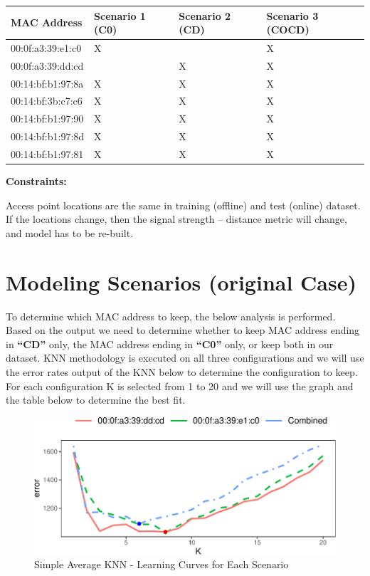 \documentclass[
]{article}
\begin{document}
\begin{longtable}[]{@{}llll@{}}
\toprule
MAC Address & Scenario 1 (C0) & Scenario 2 (CD) & Scenario 3
(COCD)\tabularnewline
\midrule
\endhead
00:0f:a3:39:e1:c0 & X & & X\tabularnewline
00:0f:a3:39:dd:cd & & X & X\tabularnewline
00:14:bf:b1:97:8a & X & X & X\tabularnewline
00:14:bf:3b:c7:c6 & X & X & X\tabularnewline
00:14:bf:b1:97:90 & X & X & X\tabularnewline
00:14:bf:b1:97:8d & X & X & X\tabularnewline
00:14:bf:b1:97:81 & X & X & X\tabularnewline
\bottomrule
\end{longtable}

\newpage

\textbf{Constraints:}

Access point locations are the same in training (offline) and test
(online) dataset. If the locations change, then the signal strength --
distance metric will change, and model has to be re-built.

\newpage

\hypertarget{modeling-scenarios-original-case}{%
\section{Modeling Scenarios (original
Case)}\label{modeling-scenarios-original-case}}

To determine which MAC address to keep, the below analysis is performed.
Based on the output we need to determine whether to keep MAC address
ending in \textbf{``CD''} only, the MAC address ending in
\textbf{``C0''} only, or keep both in our dataset. KNN methodology is
executed on all three configurations and we will use the error rates
output of the KNN below to determine the configuration to keep. For each
configuration K is selected from 1 to 20 and we will use the graph and
the table below to determine the best fit.

\begin{figure}[H]

{\centering \includegraphics{msds7333_case_study01_files/figure-latex/unnamed-chunk-9-1} 

}

\caption{Simple Average KNN - Learning Curves for Each Scenario}\label{fig:unnamed-chunk-9}
\end{figure}
\end{document}
